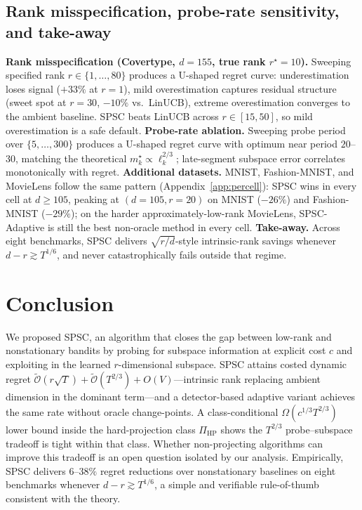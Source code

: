 \documentclass{article}
\newcommand{\tilO}{\widetilde{\mathcal{O}}}
\begin{document}
\subsection{Rank misspecification, probe-rate sensitivity, and take-away}
\label{sec:exp_sensitivity}

\textbf{Rank misspecification (Covertype, $d{=}155$, true rank
$r^\star{=}10$).} Sweeping specified rank $r\in\{1,\ldots,80\}$
produces a U-shaped regret curve: underestimation loses signal
($+33\%$ at $r{=}1$), mild overestimation captures residual structure
(sweet spot at $r{=}30$, $-10\%$ vs.\ LinUCB), extreme overestimation
converges to the ambient baseline. SPSC beats LinUCB across
$r\in[15,50]$, so mild overestimation is a safe default.
\textbf{Probe-rate ablation.} Sweeping probe period over
$\{5,\ldots,300\}$ produces a U-shaped regret curve with optimum
near period $20$--$30$, matching the theoretical
$m_k^\star\propto \ell_k^{2/3}$; late-segment subspace error
correlates monotonically with regret.
\textbf{Additional datasets.} MNIST, Fashion-MNIST, and MovieLens
follow the same pattern (Appendix~\ref{app:percell}): SPSC wins in
every cell at $d\ge 105$, peaking at $(d{=}105,r{=}20)$ on MNIST
($-26\%$) and Fashion-MNIST ($-29\%$); on the harder
approximately-low-rank MovieLens, SPSC-Adaptive is still the best
non-oracle method in every cell.
\textbf{Take-away.} Across eight benchmarks, SPSC delivers
$\sqrt{r/d}$-style intrinsic-rank savings whenever
$d-r\gtrsim T^{1/6}$, and never catastrophically fails outside
that regime.

\section{Conclusion}
\label{sec:conclusion}

We proposed SPSC, an algorithm that closes the gap between
low-rank and nonstationary bandits by probing for
subspace information at explicit cost $c$ and exploiting in the
learned $r$-dimensional subspace. SPSC attains costed dynamic regret
$\tilO(r\sqrt{T}) + \tilO(T^{2/3}) + O(V)$---intrinsic rank
replacing ambient dimension in the dominant term---and a
detector-based adaptive variant achieves the same rate without
oracle change-points. A class-conditional $\Omega(c^{1/3}T^{2/3})$
lower bound inside the hard-projection class $\Pi_{\mathrm{HP}}$ shows
the $T^{2/3}$ probe--subspace tradeoff is tight within that class. Whether non-projecting
algorithms can improve this tradeoff is an open question
isolated by our analysis. Empirically, SPSC delivers
$6$--$38\%$ regret reductions over nonstationary baselines on eight
benchmarks whenever $d - r \gtrsim T^{1/6}$, a simple and
verifiable rule-of-thumb consistent with the theory.
\end{document}
